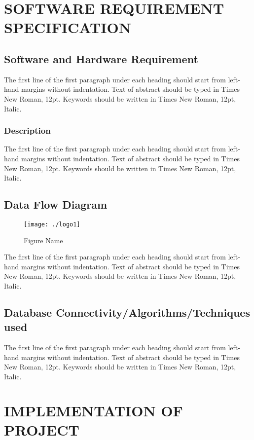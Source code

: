 \documentclass[a4paper, 12pt]{report}
\begin{document}
\chapter{SOFTWARE REQUIREMENT SPECIFICATION}
\section{Software and Hardware Requirement}
\par The first line of the first paragraph under each heading should start from left-hand margins without indentation.  Text of abstract should be typed in Times New Roman, 12pt. Keywords should be written in Times New Roman, 12pt, Italic.\\

\subsection{Description}
\par The first line of the first paragraph under each heading should start from left-hand margins without indentation.  Text of abstract should be typed in Times New Roman, 12pt. Keywords should be written in Times New Roman, 12pt, Italic.\\
\section{Data Flow Diagram}
\begin{figure}[h]
\centering
\texttt{[image: ./logo1]}
\caption{Figure Name}
\end{figure}
\par The first line of the first paragraph under each heading should start from left-hand margins without indentation.  Text of abstract should be typed in Times New Roman, 12pt. Keywords should be written in Times New Roman, 12pt, Italic.\\

\section{Database Connectivity/Algorithms/Techniques used}
\par The first line of the first paragraph under each heading should start from left-hand margins without indentation.  Text of abstract should be typed in Times New Roman, 12pt. Keywords should be written in Times New Roman, 12pt, Italic.\\
\chapter{IMPLEMENTATION OF PROJECT}
\end{document}
